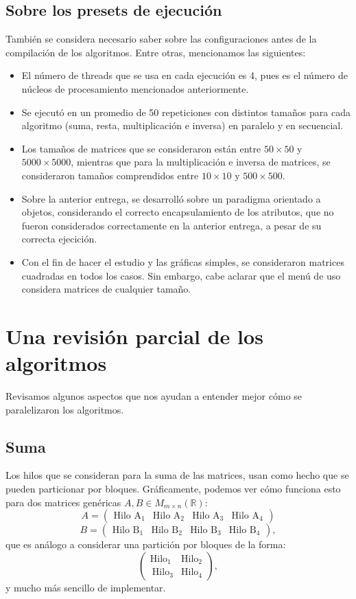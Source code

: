 \documentclass{article}\usepackage[]{graphicx}\usepackage[]{color}
\begin{document}
\subsection*{Sobre los presets de ejecución}
También se considera necesario saber sobre las configuraciones antes de la compilación de los algoritmos. Entre otras, mencionamos las siguientes:
\begin{itemize}
	\item El número de threads que se usa en cada ejecución es 4, pues es el número de núcleos de procesamiento mencionados anteriormente.
	\item Se ejecutó en un promedio de 50 repeticiones con distintos tamaños para cada algoritmo (suma, resta, multiplicación e inversa) en paralelo y en secuencial.
	\item Los tamaños de matrices que se consideraron están entre $50\times 50$ y \linebreak $5000\times5000$, mientras que para la multiplicación e inversa de matrices, se consideraron tamaños comprendidos entre $10\times 10$ y $500\times 500$.
	\item Sobre la anterior entrega, se desarrolló sobre un paradigma orientado a objetos, considerando el correcto encapsulamiento de los atributos, que no fueron considerados correctamente en la anterior entrega, a pesar de su correcta ejecición.
	\item Con el fin de hacer el estudio y las gráficas  simples, se consideraron matrices cuadradas en todos los casos. Sin embargo, cabe aclarar que el menú de uso considera matrices de cualquier tamaño.
\end{itemize}
\section{Una revisión parcial de los algoritmos}
Revisamos algunos aspectos que nos ayudan a entender mejor cómo se paralelizaron los algoritmos.
\subsection*{Suma}
Los hilos que se consideran para la suma de las matrices, usan como hecho que se pueden particionar por bloques. Gráficamente, podemos ver cómo funciona esto para dos matrices genéricas $A,B\in M_{m\times n}(\mathbb{R})$:
\[ A = \begin{pmatrix}
	\text{Hilo A}_1 & \text{Hilo A}_2&	\text{Hilo A}_3& \text{Hilo A}_4
\end{pmatrix}
\]
\[ B = \begin{pmatrix}
	\text{Hilo B}_1 & \text{Hilo B}_2&	\text{Hilo B}_3& \text{Hilo B}_4
\end{pmatrix},
\]
que es análogo a considerar una partición por  bloques de la forma:
\[ 
\begin{pmatrix}
	\text{Hilo}_1 & \text{Hilo}_2\\\
	\text{Hilo}_3& \text{Hilo}_4
\end{pmatrix},
\]
y mucho más sencillo de implementar.
\end{document}
